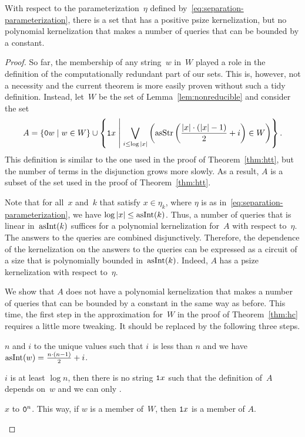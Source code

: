 \begin{theorem}
\label{thm:hpsize}%
  With respect to the parameterization~$\eta$ defined by~\eqref{eq:separation-parameterization}, there is a set that has a positive psize kernelization, but no polynomial kernelization that makes a number of queries that can be bounded by a constant.
\end{theorem}
\begin{proof}
  So far, the membership of any string~$w$ in~$W$ played a role in the definition of the computationally redundant part of our sets.
  This is, however, not a necessity and the current theorem is more easily proven without such a tidy definition.
  Instead, let~$W$ be the set of Lemma~\ref{lem:nonreducible} and consider the set
  \begin{equation*}
    A \deq \{\bits{0}w \st w \in W\} \cup \left\{\bits{1}x \st[\middle] \bigvee_{i \le \log\length{x}} \left(\asStr\left(\frac{\length{x} \cdot (\length{x} - 1)}{2} + i\right) \in W\right)\right\}.
  \end{equation*}
  This definition is similar to the one used in the proof of Theorem~\ref{thm:htt}, but the number of terms in the disjunction grows more slowly.
  As a result, $A$ is a subset of the set used in the proof of Theorem~\ref{thm:htt}.

  Note that for all~$x$ and~$k$ that satisfy $x \in \eta_k$, where $\eta$ is as in~\eqref{eq:separation-parameterization}, we have $\log \length{x} \le \asNat(k)$.
  Thus, a number of queries that is linear in~$\asNat(k)$ suffices for a polynomial kernelization for~$A$ with respect to~$\eta$.
  The answers to the queries are combined disjunctively.
  Therefore, the dependence of the kernelization on the answers to the queries can be expressed as a circuit of a size that is polynomially bounded in~$\asNat(k)$.
  Indeed, $A$ has a psize kernelization with respect to~$\eta$.

  We show that $A$ does not have a polynomial kernelization that makes a number of queries that can be bounded by a constant in the same way as before.
  This time, the first step in the approximation for~$W$ in the proof of Theorem~\ref{thm:hc} requires a little more tweaking.
  It should be replaced by the following three steps.
  \begin{codelisting}
  \item
     $n$ and $i$ to the unique values such that $i$~is less than $n$ and we have $\asNat(w) = \frac{n \cdot (n - 1)}{2} + i$.
  \item
     $i$ is at least $\log n$, then there is no string $\bits{1}x$ such that the definition of~$A$ depends on~$w$ and we can only  .
  \item
     $x$ to $\bits{0}^n$.
    This way, if $w$ is a member of~$W$, then $\bits{1}x$ is a member of $A$.
  \end{codelisting}


\end{proof}
